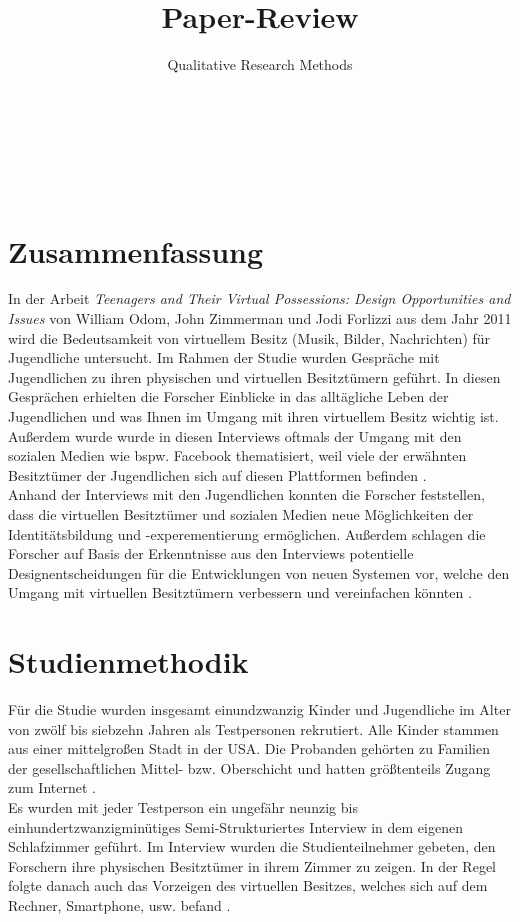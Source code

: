 \documentclass{hsflensburg}
\title{Paper-Review}
\subtitle{Qualitative Research Methods}
\author{
	\name{Tom Hartelt}\\
	\institution{Hochschule Flensburg}
	\and
	\name{Martin Hermannsen}\\
	\institution{Hochschule Flensburg}
	\and
	\name{Michael Frank}\\
	\institution{Hochschule Flensburg}
}
\begin{document}
	\maketitle
 	 \tableofcontents

  \pagebreak
	
	\section{Zusammenfassung}
	In der Arbeit \textit{Teenagers and Their Virtual Possessions: Design Opportunities and Issues} von
 	William Odom, John Zimmerman und Jodi Forlizzi aus dem Jahr 2011 wird die Bedeutsamkeit 
	von virtuellem Besitz (Musik, Bilder, Nachrichten) für Jugendliche untersucht. Im Rahmen der 
	Studie wurden Gespräche mit  Jugendlichen zu ihren physischen und virtuellen Besitztümern 
	geführt. In diesen Gesprächen erhielten die Forscher Einblicke in das alltägliche Leben der 
	Jugendlichen und was Ihnen im  Umgang mit ihren virtuellem Besitz wichtig ist. Außerdem wurde
	wurde in diesen Interviews oftmals der Umgang mit den sozialen Medien wie bspw. Facebook thematisiert, 
	weil viele der erwähnten Besitztümer der Jugendlichen sich auf diesen Plattformen befinden 
	\cite{odom2011teenagers}. \\

	Anhand der Interviews mit den Jugendlichen konnten die Forscher feststellen, dass die 
	virtuellen Besitztümer und sozialen Medien neue Möglichkeiten der Identitätsbildung 
	und -experementierung ermöglichen. Außerdem schlagen die Forscher auf Basis der 
	Erkenntnisse aus den Interviews potentielle Designentscheidungen für die 
	Entwicklungen von neuen Systemen vor, welche den Umgang mit virtuellen 
	Besitztümern verbessern und vereinfachen könnten \cite{odom2011teenagers}. 


	\section{Studienmethodik}
	Für die Studie wurden insgesamt einundzwanzig Kinder und Jugendliche im Alter
	von zwölf bis siebzehn Jahren als Testpersonen rekrutiert. Alle Kinder stammen
	aus einer mittelgroßen Stadt in der USA. Die Probanden gehörten zu Familien
	der gesellschaftlichen Mittel- bzw. Oberschicht und hatten größtenteils Zugang 
	zum Internet \cite{odom2011teenagers}. \\

	Es wurden mit jeder Testperson ein ungefähr neunzig bis einhundertzwanzigminütiges
	Semi-Strukturiertes Interview in dem eigenen Schlafzimmer geführt. Im Interview
	wurden die Studienteilnehmer gebeten, den Forschern ihre physischen Besitztümer
	in ihrem Zimmer zu zeigen. In der Regel folgte danach auch das Vorzeigen des
	virtuellen Besitzes, welches sich auf dem Rechner, Smartphone, usw. befand 
	\cite{odom2011teenagers}. \\
\end{document}
